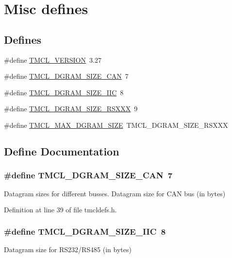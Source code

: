 \hypertarget{group__TMCLMisc}{
\section{Misc defines}
\label{group__TMCLMisc}
}
\subsection*{Defines}
\begin{DoxyCompactItemize}
\item 
\#define \hyperlink{group__TMCLMisc_ga420f7d4b6299372763e4ac6ca6d4919a}{TMCL\_\-VERSION}~3.27
\item 
\#define \hyperlink{group__TMCLMisc_ga7d2c47709a2fef9913f9c4000d68c814}{TMCL\_\-DGRAM\_\-SIZE\_\-CAN}~7
\item 
\#define \hyperlink{group__TMCLMisc_gac361bd7186e0b9243b2a8d6dbd465660}{TMCL\_\-DGRAM\_\-SIZE\_\-IIC}~8
\item 
\#define \hyperlink{group__TMCLMisc_ga893fbfdcd1c9af739173be6476ad1696}{TMCL\_\-DGRAM\_\-SIZE\_\-RSXXX}~9
\item 
\#define \hyperlink{group__TMCLMisc_gad1cf3cae816b86b67bb50098b690a010}{TMCL\_\-MAX\_\-DGRAM\_\-SIZE}~TMCL\_\-DGRAM\_\-SIZE\_\-RSXXX
\end{DoxyCompactItemize}


\subsection{Define Documentation}
\hypertarget{group__TMCLMisc_ga7d2c47709a2fef9913f9c4000d68c814}{
\subsubsection[{TMCL\_\-DGRAM\_\-SIZE\_\-CAN}]{\setlength{\rightskip}{0pt plus 5cm}\#define TMCL\_\-DGRAM\_\-SIZE\_\-CAN~7}}
\label{group__TMCLMisc_ga7d2c47709a2fef9913f9c4000d68c814}
Datagram sizes for different busses. Datagram size for CAN bus (in bytes) 

Definition at line 39 of file tmcldefs.h.\hypertarget{group__TMCLMisc_gac361bd7186e0b9243b2a8d6dbd465660}{
\subsubsection[{TMCL\_\-DGRAM\_\-SIZE\_\-IIC}]{\setlength{\rightskip}{0pt plus 5cm}\#define TMCL\_\-DGRAM\_\-SIZE\_\-IIC~8}}
\label{group__TMCLMisc_gac361bd7186e0b9243b2a8d6dbd465660}
Datagram size for RS232/RS485 (in bytes) 


